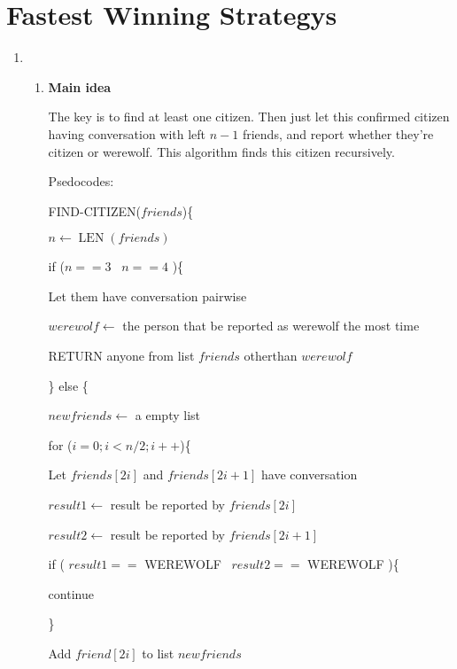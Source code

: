 \documentclass[11pt]{article}
\begin{document}
  \section{Fastest Winning Strategys}
\renewcommand{\labelenumi}{(\alph{enumi})}
\begin{enumerate}
	\item
	
		\renewcommand{\theenumii}{\roman{enumii}}
	\begin{enumerate}
		\item \textbf{Main idea}
		
		The key is to find at least one citizen. Then just let this confirmed citizen having conversation with left $n-1$ friends, and report whether they're citizen or werewolf. This algorithm finds this citizen recursively. 
		
		Psedocodes:
		
		FIND-CITIZEN($friends$)\{
		
			\qquad $n \leftarrow \operatorname{LEN}(friends)$
		
			\qquad if ($n == 3$ \textbar\textbar\ $n == 4$ )\{
			
				\qquad\qquad Let them have conversation pairwise
				
				\qquad\qquad $werewolf \leftarrow$ the person that be reported as werewolf the most time
				
				\qquad\qquad RETURN anyone from list $friends$ otherthan $werewolf$
								
			\qquad\} else \{
			
				\qquad\qquad $newfriends \leftarrow$  a empty list
			
				\qquad\qquad  for ($i=0;i<n/2;i++$)\{
					
					\qquad\qquad\qquad Let $friends\left[2i\right]$ and $friends\left[2i+1\right]$ have conversation
					
					\qquad\qquad\qquad $result1 \leftarrow$ result be reported by $friends\left[2i\right]$
					
					\qquad\qquad\qquad $result2 \leftarrow$ result be reported by $friends\left[2i+1\right]$
					
					\qquad\qquad\qquad if ( $result1==$ WEREWOLF \textbar\textbar\ $result2==$ WEREWOLF )\{
					
					\qquad\qquad\qquad\qquad continue
					
					\qquad\qquad\qquad \}
					
					\qquad\qquad\qquad Add $friend\left[2i\right]$ to list $newfriends$
				

\end{enumerate}
\end{enumerate}
\end{document}
